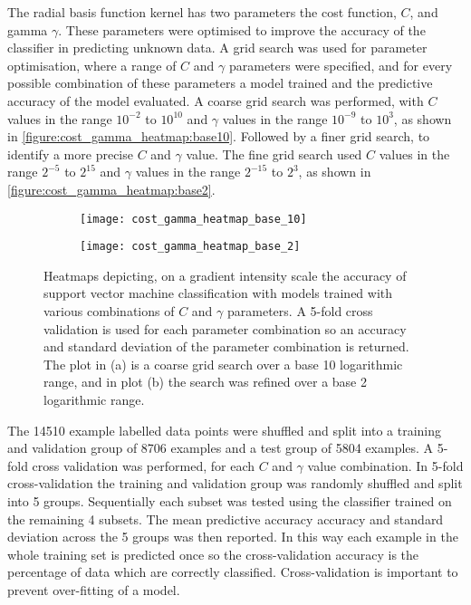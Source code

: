 The radial basis function kernel has two parameters the cost function, $C$, and gamma $\gamma$. These parameters were optimised to improve the accuracy of the classifier in predicting unknown data. A grid search was used for parameter optimisation, where a range of $C$ and $\gamma$ parameters were specified, and for every possible combination of these parameters a model trained and the predictive accuracy of the model evaluated. A coarse grid search was performed, with $C$ values in the range $10^{-2}$ to $10^{10}$ and $\gamma$ values in the range $10^{-9}$ to $10^{3}$, as shown in \autoref{figure:cost_gamma_heatmap:base10}. Followed by a finer grid search, to identify a more precise $C$ and $\gamma$ value. The fine grid search used $C$ values in the range $2^{-5}$ to $2^{15}$ and $\gamma$ values in the range $2^{-15}$ to $2^{3}$, as shown in \autoref{figure:cost_gamma_heatmap:base2}.
\begin{figure}[htbp]{}
	\centering
	\begin{subfigure}[b]{0.7\linewidth}
		\texttt{[image: cost\_gamma\_heatmap\_base\_10]}
		\caption{}
		\label{figure:cost_gamma_heatmap:base10}
	\end{subfigure}
	\begin{subfigure}[b]{0.7\linewidth}
		\texttt{[image: cost\_gamma\_heatmap\_base\_2]}
		\caption{}
		\label{figure:cost_gamma_heatmap:base2}
	\end{subfigure}
\caption[Radial basis function grid-search parameter optimisation]{Heatmaps depicting, on a gradient intensity scale the accuracy of support vector machine classification with models trained with various combinations of $C$ and $\gamma$ parameters. A 5-fold cross validation is used for each parameter combination so an accuracy and standard deviation of the parameter combination is returned. The plot in (a) is a coarse grid search over a base 10 logarithmic range, and in plot (b) the search was refined over a base 2 logarithmic range.}
\label{figure:cost_gamma_heatmap}
\end{figure}

The 14510 example labelled data points were shuffled and split into a training and validation group of 8706 examples and a test group of 5804 examples. A 5-fold cross validation was performed, for each $C$ and $\gamma$ value combination. In 5-fold cross-validation the training and validation group was randomly shuffled and split into 5 groups. Sequentially each subset was tested using the classifier trained on the remaining 4 subsets. The mean predictive accuracy accuracy and standard deviation across the 5 groups was then reported. In this way each example in the whole training set is predicted once so the cross-validation accuracy is the percentage of data which are correctly classified. Cross-validation is important to prevent over-fitting of a model.

